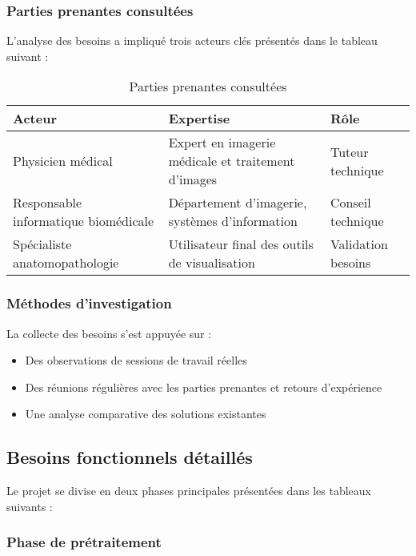 \documentclass[12pt,a4paper]{report}
\begin{document}
\begin{}
\subsubsection{Parties prenantes consultées}

L'analyse des besoins a impliqué trois acteurs clés présentés dans le tableau suivant :

\begin{table}[H]
\centering
\begin{tabular}{|p{4cm}|p{8cm}|p{3cm}|}
\hline
\rowcolor{TableHeaderColor}
\textbf{Acteur} & \textbf{Expertise} & \textbf{Rôle} \\
\hline
Physicien médical & Expert en imagerie médicale et traitement d'images & Tuteur technique \\
\hline
Responsable informatique biomédicale & Département d'imagerie, systèmes d'information & Conseil technique \\
\hline
Spécialiste anatomopathologie & Utilisateur final des outils de visualisation & Validation besoins \\
\hline
\end{tabular}
\caption{Parties prenantes consultées}
\end{table}

\subsubsection{Méthodes d'investigation}

La collecte des besoins s'est appuyée sur :
\begin{itemize}
\item Des observations de sessions de travail réelles
\item Des réunions régulières avec les parties prenantes et retours d'expérience
\item Une analyse comparative des solutions existantes
\end{itemize}

\subsection{Besoins fonctionnels détaillés}

Le projet se divise en deux phases principales présentées dans les tableaux suivants :

\subsubsection{Phase de prétraitement}


\end{}
\end{document}
